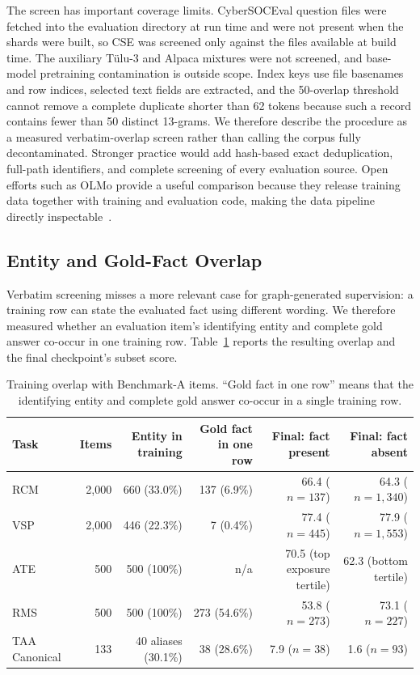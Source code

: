 \documentclass[conference]{IEEEtran}
\begin{document}
The screen has important coverage limits. CyberSOCEval question files were fetched into the evaluation directory at run time and were not present when the shards were built, so CSE was screened only against the files available at build time. The auxiliary T\"ulu-3 and Alpaca mixtures were not screened, and base-model pretraining contamination is outside scope. Index keys use file basenames and row indices, selected text fields are extracted, and the 50-overlap threshold cannot remove a complete duplicate shorter than 62 tokens because such a record contains fewer than 50 distinct 13-grams. We therefore describe the procedure as a measured verbatim-overlap screen rather than calling the corpus fully decontaminated. Stronger practice would add hash-based exact deduplication, full-path identifiers, and complete screening of every evaluation source. Open efforts such as OLMo provide a useful comparison because they release training data together with training and evaluation code, making the data pipeline directly inspectable~\cite{groeneveld2024olmo}.

\subsection{Entity and Gold-Fact Overlap}
Verbatim screening misses a more relevant case for graph-generated supervision: a training row can state the evaluated fact using different wording. We therefore measured whether an evaluation item's identifying entity and complete gold answer co-occur in one training row. Table~\ref{tab:overlap} reports the resulting overlap and the final checkpoint's subset score.

\begin{table}[t]
\caption{Training overlap with Benchmark-A items. ``Gold fact in one row'' means that the identifying entity and complete gold answer co-occur in a single training row.}
\label{tab:overlap}
\centering
\scriptsize
\setlength{\tabcolsep}{3.5pt}
\begin{tabular}{@{}lrrrrr@{}}
\toprule
Task & Items & Entity in training & Gold fact in one row & Final: fact present & Final: fact absent \\
\midrule
RCM & 2,000 & 660 (33.0\%) & 137 (6.9\%) & 66.4 ($n=137$) & 64.3 ($n=1,340$) \\
VSP & 2,000 & 446 (22.3\%) & 7 (0.4\%) & 77.4 ($n=445$) & 77.9 ($n=1,553$) \\
ATE & 500 & 500 (100\%) & n/a & 70.5 (top exposure tertile) & 62.3 (bottom tertile) \\
RMS & 500 & 500 (100\%) & 273 (54.6\%) & 53.8 ($n=273$) & 73.1 ($n=227$) \\
TAA Canonical & 133 & 40 aliases (30.1\%) & 38 (28.6\%) & 7.9 ($n=38$) & 1.6 ($n=93$) \\
\bottomrule
\end{tabular}
\end{table}
\end{document}
